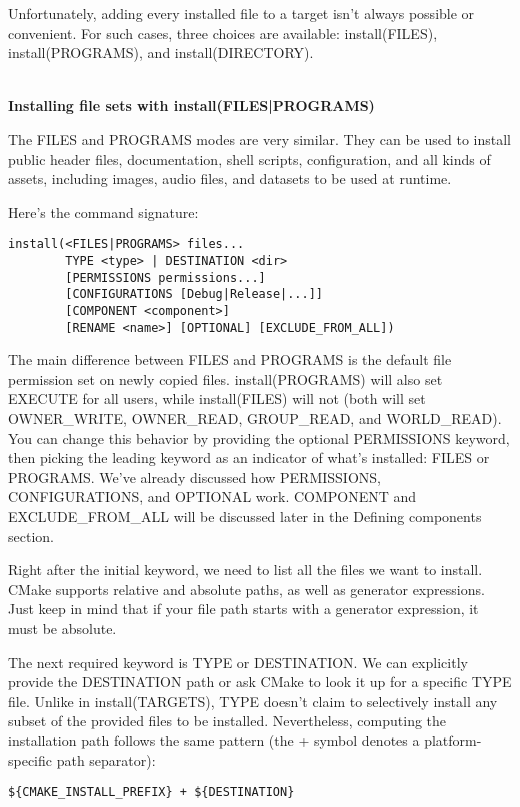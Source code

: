 Unfortunately, adding every installed file to a target isn't always possible or convenient. For such cases, three choices are available: install(FILES), install(PROGRAMS), and install(DIRECTORY).

\hspace*{\fill} \\ %
\noindent
\textbf{Installing file sets with install(FILES|PROGRAMS)}

The FILES and PROGRAMS modes are very similar. They can be used to install public header files, documentation, shell scripts, configuration, and all kinds of assets, including images, audio files, and datasets to be used at runtime.

Here's the command signature:

\begin{lstlisting}[style=styleCMake]
install(<FILES|PROGRAMS> files...
		TYPE <type> | DESTINATION <dir>
		[PERMISSIONS permissions...]
		[CONFIGURATIONS [Debug|Release|...]]
		[COMPONENT <component>]
		[RENAME <name>] [OPTIONAL] [EXCLUDE_FROM_ALL])
\end{lstlisting}

The main difference between FILES and PROGRAMS is the default file permission set on newly copied files. install(PROGRAMS) will also set EXECUTE for all users, while install(FILES) will not (both will set OWNER\_WRITE, OWNER\_READ, GROUP\_READ, and WORLD\_READ). You can change this behavior by providing the optional PERMISSIONS keyword, then picking the leading keyword as an indicator of what's installed: FILES or PROGRAMS. We've already discussed how PERMISSIONS, CONFIGURATIONS, and OPTIONAL work. COMPONENT and EXCLUDE\_FROM\_ALL will be discussed later in the Defining components section.

Right after the initial keyword, we need to list all the files we want to install. CMake supports relative and absolute paths, as well as generator expressions. Just keep in mind that if your file path starts with a generator expression, it must be absolute.

The next required keyword is TYPE or DESTINATION. We can explicitly provide the DESTINATION path or ask CMake to look it up for a specific TYPE file. Unlike in install(TARGETS), TYPE doesn't claim to selectively install any subset of the provided files to be installed. Nevertheless, computing the installation path follows the same pattern (the + symbol denotes a platform-specific path separator):

\begin{lstlisting}[style=styleCMake]
${CMAKE_INSTALL_PREFIX} + ${DESTINATION}
\end{lstlisting}

